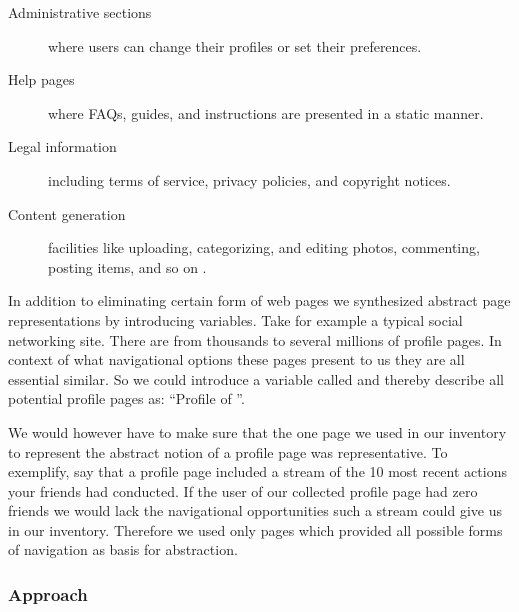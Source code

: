 \begin{description}
  \item[Administrative sections] where users can change their profiles or set
    their preferences.
  \item[Help pages] where FAQs, guides, and instructions are presented in a
    static manner.
  \item[Legal information] including terms of service, privacy policies, and
    copyright notices.
  \item[Content generation] facilities like uploading, categorizing, and
    editing photos, commenting, posting items, and so on%
    .
\end{description}

In addition to eliminating certain form of web pages we synthesized abstract
page representations by introducing variables. Take for example a typical
social networking site. There are from thousands to several millions of
profile pages. In context of what navigational options these pages present to
us they are all essential similar. So we could introduce a variable called
%
and thereby describe all potential profile pages as: ``Profile
of ''.

We would however have to make sure that the one page we used in our inventory
to represent the abstract notion of a profile page was representative. To
exemplify, say that a profile page included a stream of the 10 most recent
actions your friends had conducted. If the user of our collected profile page
had zero friends we would lack the navigational opportunities such a stream
could give us in our inventory. Therefore we used only pages which provided
all possible forms of navigation as basis for abstraction.

\subsubsection{Approach}

